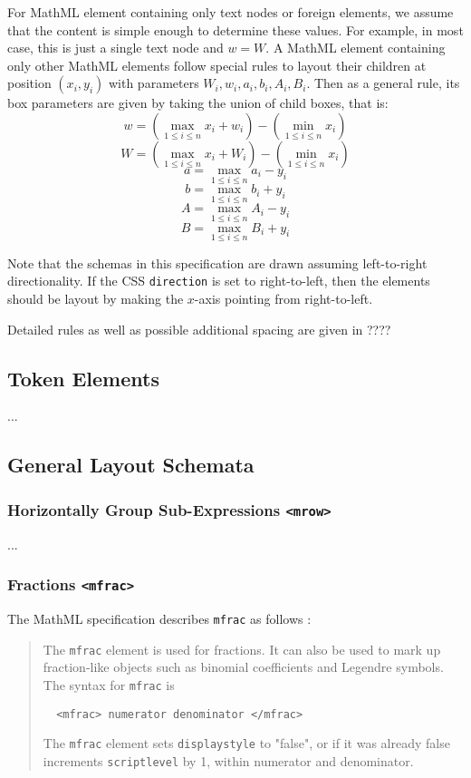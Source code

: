 For MathML element containing only text nodes or foreign elements, we assume
that the content is simple enough to determine these values. For example,
in most case, this is just a single text node and $w = W$.
A MathML element containing only other MathML elements follow special rules to
layout their children at position $(x_i,y_i)$ with parameters
$W_i,w_i,a_i,b_i,A_i,B_i$. Then as a general rule, its box parameters are given
by taking the union of child boxes, that is:
%
$$w = \left(\max_{1 \leq i \leq n } {x_i + w_i}\right) -
      \left(\min_{1 \leq i \leq n} x_i\right)$$
$$W = \left(\max_{1 \leq i \leq n } {x_i + W_i}\right) -
      \left(\min_{1 \leq i \leq n} x_i\right)$$
$$a = \max_{1 \leq i \leq n } {a_i - y_i}$$
$$b = \max_{1 \leq i \leq n } {b_i + y_i}$$
$$A = \max_{1 \leq i \leq n } {A_i - y_i}$$
$$B = \max_{1 \leq i \leq n } {B_i + y_i}$$
%

Note that the schemas in this specification are drawn assuming left-to-right
directionality. If the CSS {\tt direction} is set to right-to-left, then the
elements should be layout by making the $x$-axis pointing from right-to-left.

Detailed rules as well as possible additional spacing are given in ????

\subsection{Token Elements}

...

\subsection{General Layout Schemata}

\subsubsection{Horizontally Group Sub-Expressions {\tt <mrow>}}

...

\subsubsection{Fractions {\tt <mfrac>}}

The MathML specification describes {\tt mfrac} as follows \cite{MathML3}:
%
\begin{quote}
The {\tt mfrac} element is used for fractions. It can also be used to mark up
fraction-like objects such as binomial coefficients and Legendre symbols.
The syntax for {\tt mfrac} is
%
\begin{lstlisting}
  <mfrac> numerator denominator </mfrac>
\end{lstlisting}
%
The {\tt mfrac} element sets {\tt displaystyle} to "false", or if it was
already false increments {\tt scriptlevel} by 1, within numerator and
denominator.
\end{quote}

